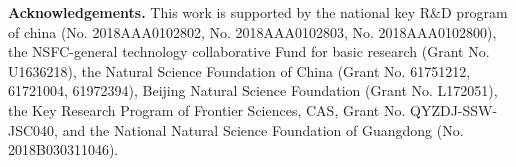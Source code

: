 \documentclass{article}
\begin{document}
\vspace{+4.5mm}
{\parindent0pt %

\textbf{Acknowledgements.} This work is supported by the national key R&D program of china (No. 2018AAA0102802, No. 2018AAA0102803, No. 2018AAA0102800), the NSFC-general technology collaborative Fund for basic research (Grant No. U1636218), the Natural Science Foundation of China (Grant No. 61751212, 61721004, 61972394), Beijing Natural Science Foundation (Grant No. L172051), the Key Research Program of Frontier Sciences, CAS, Grant No. QYZDJ-SSW-JSC040, and the National Natural Science Foundation of Guangdong (No. 2018B030311046).

}%
\newpage

\end{document}
